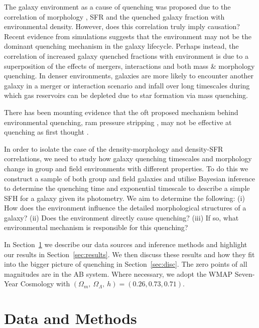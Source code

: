 \documentclass[useAMS,usenatbib]{mn2e}
\begin{document}
 The galaxy environment as a cause of quenching was proposed due to the correlation of morphology \citep{dressler80, smail97, poggianti99, postman05, bamford09}, SFR and the quenched galaxy fraction \citep{kauffmann03, baldry06, peng12, darvish16} with environmental density. However, does this correlation truly imply causation? Recent evidence from simulations  suggests that the environment may not be the dominant quenching mechanism in the galaxy lifecycle. Perhaps instead, the correlation of increased galaxy quenched fractions with environment is due to a superposition of the effects of mergers, interactions and both mass \& morphology quenching. In denser environments, galaxies are more likely to encounter another galaxy in a merger or interaction scenario and infall over long timescales during which gas reservoirs can be depleted due to star formation via mass quenching.
 
There has been mounting evidence that the oft proposed mechanism behind environmental quenching, ram pressure stripping \citep{gunngott72}, may not be effective at quenching as first thought \citep{emerick16, fillingham16}. 
 
In order to isolate the case of the density-morphology and density-SFR correlations, we need to study how galaxy quenching timescales and morphology change in group and field environments with different properties. To do this we construct a sample of both group and field galaxies and utilise Bayesian inference to determine the quenching time and exponential timescale to describe a simple SFH for a galaxy given its photometry. We aim to determine the following: (i) How does the environment influence the detailed morphological structures of a galaxy?  (ii) Does the environment directly cause quenching? (iii) If so, what environmental mechanism is responsible for this quenching?

In Section~\ref{sec:data} we describe our data sources and inference methods and highlight our results in Section~\ref{sec:results}. We then discuss these results and how they fit into the bigger picture of quenching in Section~\ref{sec:disc}. The zero points of all magnitudes are in the AB system. Where necessary, we adopt the WMAP Seven-Year Cosmology \citep{jarosik11} with $(\Omega_m , ~\Omega_\Lambda , ~h) = (0.26, 0.73, 0.71)$.

 
\section{Data and Methods}\label{sec:data}
\end{document}
